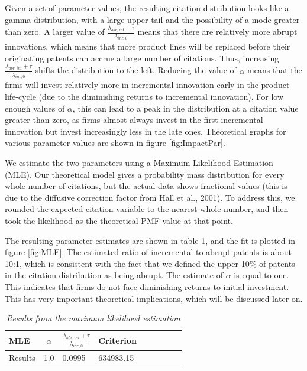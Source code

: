 \documentclass[letterpaper,12pt]{article}
\theoremstyle{definition}
\begin{document}
Given a set of parameter values, the resulting citation distribution looks like a gamma distribution, with a large upper tail and the possibility of a mode greater than zero. A larger value of $\frac{\lambda_{abr, int} + \tau}{\lambda_{inc,0}}$  means that there are relatively more abrupt innovations, which means that more product lines will be replaced before their originating patents can accrue a large number of citations. Thus, increasing $\frac{\lambda_{abr, int} + \tau}{\lambda_{inc,0}}$ shifts the distribution to the left. Reducing the value of $\alpha$ means that the firms will invest relatively more in incremental innovation early in the product life-cycle (due to the diminishing returns to incremental innovation). For low enough values of $\alpha$, this can lead to a peak in the distribution at a citation value greater than zero, as firms almost always invest in the first incremental innovation but invest increasingly less in the late ones. Theoretical graphs for various parameter values are shown in figure \ref{fig:ImpactPar}.

We estimate the two parameters using a Maximum Likelihood Estimation (MLE). Our theoretical model gives a probability mass distribution for every whole number of citations, but the actual data shows fractional values (this is due to the diffusive correction factor from Hall et al., 2001). To address this, we rounded the expected citation variable to the nearest whole number, and then took the likelihood as the theoretical PMF value at that point.

The resulting parameter estimates are shown in table \ref{tab:MLETable}, and the fit is plotted in figure \ref{fig:MLE}. The estimated ratio of incremental to abrupt patents is about 10:1, which is consistent with the fact that we defined the upper 10\% of patents in the citation distribution as being abrupt. The estimate of $\alpha$ is equal to one. This indicates that firms do not face diminishing returns to initial investment. This has very important theoretical implications, which will be discussed later on.

\begin{table}[htbp] \centering \captionsetup{width=5.8in}
    \caption{\label{tab:MLETable}\textit{Results from the maximum likelihood estimation}}
	\centering
	\begin{tabular}{l llp{1.5cm} p{0.5cm} llp{0.5cm} p{0.5cm}}
	\toprule
	MLE & \multicolumn{1}{c}{$\alpha$} & \multicolumn{1}{c}{$\frac{\lambda_{abr, int} + \tau}{\lambda_{inc,0}}$} & \multicolumn{1}{c}{Criterion}\\
	\midrule
	Results & 1.0 & 0.0995 & 634983.15\\
	\bottomrule
	\end{tabular}
\end{table}
\end{document}
